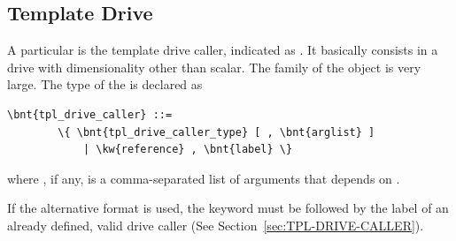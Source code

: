 \subsection{Template Drive}\label{sec:TPL-DRIVE}
A particular  is the template drive caller,
indicated as .
It basically consists in a drive with dimensionality other than scalar.
The family of the  object is very large.
The type of the  is declared as
\begin{Verbatim}[commandchars=\\\{\}]
    \bnt{tpl_drive_caller} ::=
        \{ \bnt{tpl_drive_caller_type} [ , \bnt{arglist} ]
            | \kw{reference} , \bnt{label} \}
\end{Verbatim}    
where , if any, is a comma-separated list of arguments
that depends on .

If the alternative format is used, the keyword  
must be followed by the label of an already defined, valid drive caller
(See Section~\ref{sec:TPL-DRIVE-CALLER}).

